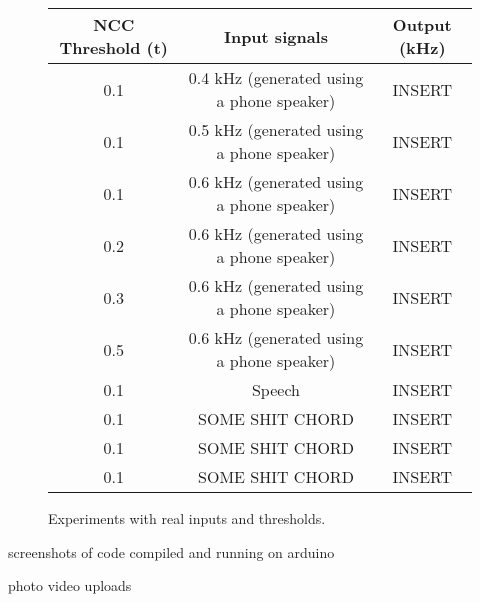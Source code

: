 \begin{figure}[ht]
    \centering
    \def\arraystretch{1.5}
    \setlength\tabcolsep{2em}
    \begin{tabular}{c | c | c}
        NCC Threshold (t)   & Input signals                                 & Output (kHz) \\ \hline
        0.1                 & 0.4 kHz (generated using a phone speaker)     & INSERT \\   
        0.1                 & 0.5 kHz (generated using a phone speaker)     & INSERT \\   
        0.1                 & 0.6 kHz (generated using a phone speaker)     & INSERT \\   
        0.2                 & 0.6 kHz (generated using a phone speaker)     & INSERT \\   
        0.3                 & 0.6 kHz (generated using a phone speaker)     & INSERT \\   
        0.5                 & 0.6 kHz (generated using a phone speaker)     & INSERT \\   
        0.1                 & Speech                                        & INSERT \\   
        0.1                 & SOME SHIT CHORD                               & INSERT \\   
        0.1                 & SOME SHIT CHORD                               & INSERT \\   
        0.1                 & SOME SHIT CHORD                               & INSERT \\   
    \end{tabular}
    \captionsetup{justification=centering}
    \caption{Experiments with real inputs and thresholds.}
    \label{fig:realexp}

\end{figure}

screenshots of code compiled and running on arduino

photo video uploads